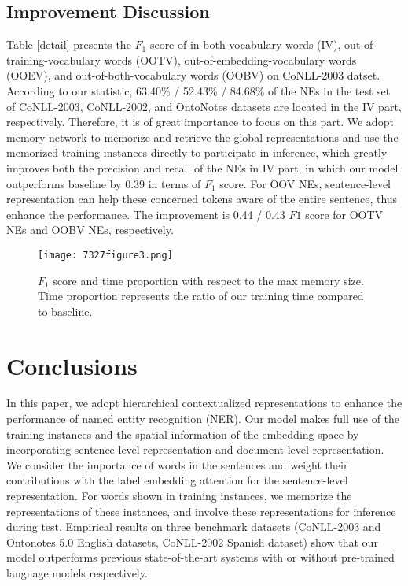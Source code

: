\documentclass[letterpaper]{article} \usepackage{aaai20}  \usepackage{times}  \usepackage{helvet} \usepackage{courier}  \usepackage[hyphens]{url}  \usepackage{graphicx} \urlstyle{rm} \def\UrlFont{\rm}  \usepackage{graphicx}  \frenchspacing  \setlength{\pdfpagewidth}{8.5in}  \setlength{\pdfpageheight}{11in}
\begin{document}
\subsection{Improvement Discussion}
 Table \ref{detail} presents the $F_1$ score of in-both-vocabulary words (IV), out-of-training-vocabulary words (OOTV), out-of-embedding-vocabulary words (OOEV), and out-of-both-vocabulary words (OOBV) on CoNLL-2003 datset. According to our statistic, 63.40\% / 52.43\% / 84.68\% of the NEs in the test set of CoNLL-2003, CoNLL-2002, and OntoNotes datasets are located in the IV part, respectively. Therefore, it is of great importance to focus on this part. We adopt memory network to memorize and retrieve the global representations and use the memorized training instances directly to participate in inference, which greatly improves both the precision and recall of the NEs in IV part, in which our model outperforms baseline by 0.39 in terms of $F_1$ score.
 For OOV NEs, sentence-level representation can help these concerned tokens aware of the entire sentence, thus enhance the performance. The improvement is 0.44 / 0.43 $F1$ score for OOTV NEs and OOBV NEs, respectively.


\begin{figure}[!t]
  \centering 
  \texttt{[image: 7327figure3.png]}
    \caption{$F_1$ score and time proportion with respect to the max memory size. Time proportion represents the ratio of our training time compared to baseline. }\label{memorysize}
\end{figure} 

\section{Conclusions} 
In this paper, we adopt hierarchical contextualized representations to enhance the performance of named entity recognition (NER). Our model makes full use of the training instances and the spatial information of the embedding space  by incorporating sentence-level representation and document-level representation.
We consider the importance of words in the sentences and weight their contributions with the label embedding attention for the sentence-level representation. 
For words shown  in training instances, we memorize the  representations of these instances, and involve these representations for inference during test. 
Empirical results on three benchmark datasets (CoNLL-2003  and Ontonotes 5.0 English datasets, CoNLL-2002 Spanish dataset)
show that our model outperforms previous state-of-the-art systems with or without pre-trained language models respectively.




\end{document}
